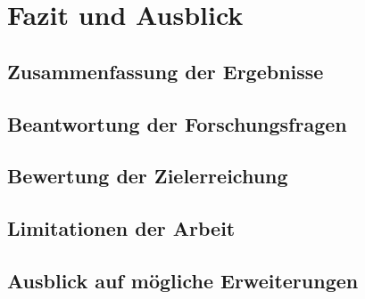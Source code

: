 \chapter{Fazit und Ausblick}\label{ch:fazit}
\section{Zusammenfassung der Ergebnisse}
\section{Beantwortung der Forschungsfragen}
\section{Bewertung der Zielerreichung}
\section{Limitationen der Arbeit}
\section{Ausblick auf mögliche Erweiterungen}
